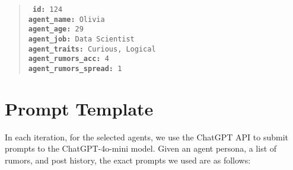 \begin{mdframed}
\begin{quote}
    \tt \small
    \textbf{id:} 124\\
    \textbf{agent\_name:} Olivia\\
    \textbf{agent\_age:} 29\\
    \textbf{agent\_job:} Data Scientist\\
    \textbf{agent\_traits:} Curious, Logical\\
    \textbf{agent\_rumors\_acc:} 4\\
    \textbf{agent\_rumors\_spread:} 1
\end{quote}
\end{mdframed}

\section{Prompt Template}

In each iteration, for the selected agents, we use the ChatGPT API to submit prompts to the ChatGPT-4o-mini model. Given an agent persona, a list of rumors, and post history, the exact prompts we used are as follows:

